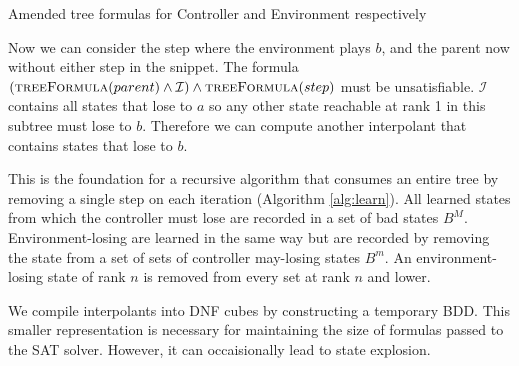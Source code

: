 \documentclass{llncs}
\newcommand{\textoverline}[1]{$\overline{\mbox{#1}}$}
\begin{document}
\begin{algorithm}
    \caption{Amended tree formulas for Controller and Environment respectively}
    \label{alg:unboundedTreeFormula}
    \begin{algorithmic}[1]
        \State {}
        \Else
        \State {}
        \EndIf
        \EndFunction
    \end{algorithmic}

    \begin{algorithmic}
        \Function{\textoverline{treeFormula}}{gt}
        \State {}
        \Else
        \State {}
        \EndIf
        \EndFunction
    \end{algorithmic}
\end{algorithm}

Now we can consider the step where the environment plays $b$, and the parent
now without either step in the snippet. The formula
$(\textsc{treeFormula}(parent) \land \mathcal{I}) \land
\textsc{treeFormula}(step)$ must be unsatisfiable.  $\mathcal{I}$ contains all
states that lose to $a$ so any other state reachable at rank 1 in this subtree
must lose to $b$.  Therefore we can compute another interpolant that contains
states that lose to $b$.

This is the foundation for a recursive algorithm that consumes an entire tree
by removing a single step on each iteration (Algorithm \ref{alg:learn}). All
learned states from which the controller must lose are recorded in a set of bad
states $B^M$. Environment-losing are learned in the same way but are recorded
by removing the state from a set of sets of controller may-losing states $B^m$.
An environment-losing state of rank $n$ is removed from every set at rank $n$
and lower.

We compile interpolants into DNF cubes by constructing a temporary BDD. This
smaller representation is necessary for maintaining the size of formulas passed
to the SAT solver. However, it can occaisionally lead to state explosion.
\end{document}
